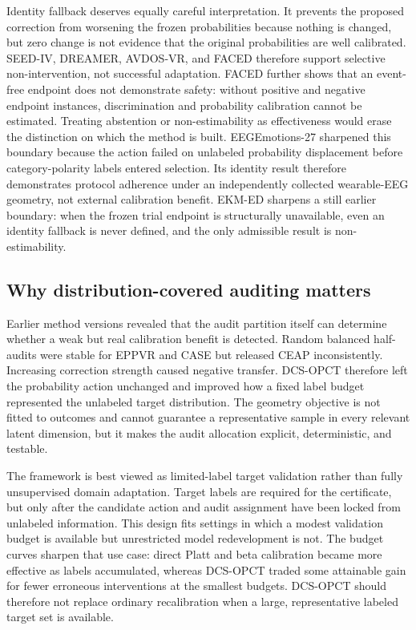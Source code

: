 \documentclass[preprint,12pt]{elsarticle}
\begin{document}
Identity fallback deserves equally careful interpretation. It prevents the proposed correction from worsening the frozen probabilities because nothing is changed, but zero change is not evidence that the original probabilities are well calibrated. SEED-IV, DREAMER, AVDOS-VR, and FACED therefore support selective non-intervention, not successful adaptation. FACED further shows that an event-free endpoint does not demonstrate safety: without positive and negative endpoint instances, discrimination and probability calibration cannot be estimated. Treating abstention or non-estimability as effectiveness would erase the distinction on which the method is built. EEGEmotions-27 sharpened this boundary because the action failed on unlabeled probability displacement before category-polarity labels entered selection. Its identity result therefore demonstrates protocol adherence under an independently collected wearable-EEG geometry, not external calibration benefit. EKM-ED sharpens a still earlier boundary: when the frozen trial endpoint is structurally unavailable, even an identity fallback is never defined, and the only admissible result is non-estimability.

\subsection{Why distribution-covered auditing matters}

Earlier method versions revealed that the audit partition itself can determine whether a weak but real calibration benefit is detected. Random balanced half-audits were stable for EPPVR and CASE but released CEAP inconsistently. Increasing correction strength caused negative transfer. DCS-OPCT therefore left the probability action unchanged and improved how a fixed label budget represented the unlabeled target distribution. The geometry objective is not fitted to outcomes and cannot guarantee a representative sample in every relevant latent dimension, but it makes the audit allocation explicit, deterministic, and testable.

The framework is best viewed as limited-label target validation rather than fully unsupervised domain adaptation. Target labels are required for the certificate, but only after the candidate action and audit assignment have been locked from unlabeled information. This design fits settings in which a modest validation budget is available but unrestricted model redevelopment is not. The budget curves sharpen that use case: direct Platt and beta calibration became more effective as labels accumulated, whereas DCS-OPCT traded some attainable gain for fewer erroneous interventions at the smallest budgets. DCS-OPCT should therefore not replace ordinary recalibration when a large, representative labeled target set is available.
\end{document}
